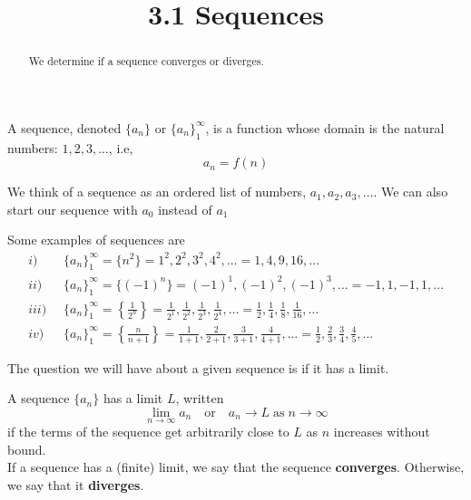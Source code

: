 \documentclass[handout]{ximera}
\title{3.1 Sequences}
\begin{document}
\begin{abstract}
We determine if a sequence converges or diverges.
\end{abstract}

\maketitle

\begin{definition}[Sequence]
A sequence, denoted $\displaystyle \{a_n\}$ or $\displaystyle \{a_n\}_{1}^\infty$, is a function whose domain is the natural numbers: $1, 2, 3, \dots$, i.e,
\[
a_n = f(n)
\]
\end{definition}
We think of a sequence as an ordered list of numbers, $a_1, a_2, a_3, \dots$. We can also start our sequence with $a_0$ instead of $a_1$

Some examples of sequences are
\begin{align*}
i) \;\; &  \{a_n\}_{1}^\infty = \{n^2\} = 1^2, 2^2, 3^2, 4^2, \dots = 1, 4, 9, 16,  \dots\\
ii) \;\; &  \{a_n\}_{1}^\infty = \{(-1)^n\} = (-1)^1, (-1)^2, (-1)^3, \dots = -1, 1, -1, 1, \dots\\
iii) \;\; &  \{a_n\}_{1}^\infty = \left\{\frac{1}{2^n}\right\} = \frac{1}{2^1}, \frac{1}{2^2}, \frac{1}{2^3}, \frac{1}{2^4}, \dots = \frac12, \frac14, \frac18, \frac{1}{16}, \dots\\
iv) \;\; &   \{a_n\}_{1}^\infty = \left\{\frac{n}{n+1}\right\} = \frac{1}{1+1}, \frac{2}{2+1}, \frac{3}{3+1}, \frac{4}{4+1}, \dots = \frac12, \frac23, \frac34, \frac45, \dots
\end{align*}

The question we will have about a given sequence is if it has a limit.

\begin{definition}
A sequence $\{a_n\}$ has a limit $L$, written
\[
\lim_{n \to \infty} a_n \quad \mbox{or} \quad a_n \to L \; \mbox{as} \; n \to \infty
\]
if the terms of the sequence get arbitrarily close to $L$ as $n$ increases without bound.\\
If a sequence has a (finite) limit, we say that the sequence {\bf converges}.  Otherwise, we say that it {\bf diverges}.
\end{definition}
\end{document}
